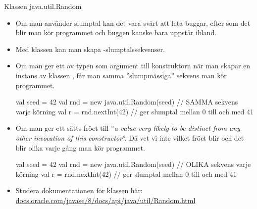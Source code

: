 

\ifkompendium\else


\begin{Slide}{Klassen java.util.Random}\SlideFontTiny
\begin{itemize}
\item Om man använder slumptal kan det vara svårt att leta buggar, efter som det blir  man kör programmet och buggen kanske bara uppstår ibland.

\item Med klassen  kan man skapa -slumptalssekvenser.
\pause
\item Om man ger ett   av typen  som argument till konstruktorn när man skapar en instans av klassen , får man samma ''slumpmässiga'' sekvens  man kör programmet.

\begin{Code}
  val seed = 42
  val rnd = new java.util.Random(seed)  // SAMMA sekvens varje körning
  val r = rnd.nextInt(42) // ger slumptal mellan 0 till och med 41
\end{Code}
\pause
\item Om man  ger ett  sätts fröet till ''\emph{a value very likely to be distinct from any other invocation of this constructor}''. Då vet vi inte vilket fröet blir och det blir olika varje gång man kör programmet.
\begin{Code}
  val seed = 42
  val rnd = new java.util.Random(seed)  // OLIKA sekvens varje körning
  val r = rnd.nextInt(42) // ger slumptal mellan 0 till och med 41
\end{Code}
\pause
\item Studera dokumentationen för klassen  här: \href{https://docs.oracle.com/javase/8/docs/api/java/util/Random.html}{\SlideFontSmall docs.oracle.com/javase/8/docs/api/java/util/Random.html}

\end{itemize}
\end{Slide}

